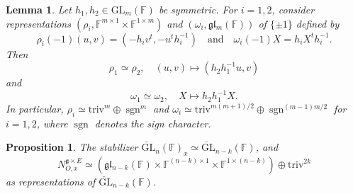 \documentclass[10pt,a4paper]{amsart}
\newtheorem{lm}{Lemma}
\newtheorem{prop}{Proposition}
\newcommand{\C}{\mathbb{F}}
\newcommand{\GL}{{\mathrm{GL}}}
\newcommand{\g}{\mathfrak g}
\newcommand{\gl}{\mathfrak g \mathfrak l}
\newcommand{\sgn}{\operatorname{sgn}}
\newcommand{\triv}{\mathrm{triv}}
\begin{document}
    \begin{lm}
    	\label{lm:descentgln}
    	Let $h_1,h_2\in\GL_m(\C)$ be symmetric. For $i=1,2$, consider representations $(\rho_i,\C^{m\times 1}\times\C^{1\times m})$ and $(\omega_i,\gl_m(\C))$ of $\{\pm 1\}$ defined by
    	\begin{equation*}
    		\rho_i(-1)(u,v)=(-h_iv^t,-u^th_i^{-1})\quad\text{and}\quad\omega_i(-1)X=h_iX^th_i^{-1}.
    	\end{equation*}
    	Then
    	\begin{equation*}
    		\rho_1\simeq\rho_2,\quad (u,v)\mapsto(h_2h_1^{-1}u,v)
    	\end{equation*}
    	and
    	\begin{equation*}
    		\omega_1\simeq\omega_2,\quad X\mapsto h_2h_1^{-1}X.
    	\end{equation*}
    	In particular, $\rho_i\simeq\triv^m\oplus\sgn^m$ and $\omega_i\simeq\triv^{m(m+1)/2}\oplus\sgn^{(m-1)m/2}$ for $i=1,2$, where $\sgn$ denotes the sign character.
    \end{lm}

    \begin{prop}
    	\label{prop:descentglnmvw}
    	The stabilizer $\breve{\GL}_n(\C)_x\simeq\breve{\GL}_{n-k}(\C)$, and
    	\begin{equation}
    		\label{eq:descentgln}
    		N_{O,x}^{\g\times E}\simeq(\gl_{n-k}(\C)\times\C^{(n-k)\times 1}\times\C^{1\times(n-k)})\oplus\triv^{2k}
    	\end{equation}
    	as representations of $\breve{\GL}_{n-k}(\C)$.
    \end{prop}
\end{document}

